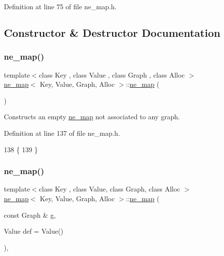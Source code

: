Definition at line 75 of file ne\+\_\+map.\+h.



\subsection{Constructor \& Destructor Documentation}
\mbox{\label{classne__map_acbe94c2209408e8af27fb9580251f360}} 
\subsubsection{\texorpdfstring{ne\+\_\+map()}{ne\_map()}\hspace{0.1cm}{\footnotesize\ttfamily [1/2]}}
{\footnotesize\ttfamily template$<$class Key , class Value , class Graph , class Alloc $>$ \\
\mbox{\hyperlink{classne__map}{ne\+\_\+map}}$<$ Key, Value, Graph, Alloc $>$\+::\mbox{\hyperlink{classne__map}{ne\+\_\+map}} (\begin{DoxyParamCaption}{ }\end{DoxyParamCaption})\hspace{0.3cm}{\ttfamily [protected]}}

Constructs an empty {\ttfamily \mbox{\hyperlink{classne__map}{ne\+\_\+map}}} not associated to any {\ttfamily graph}. 

Definition at line 137 of file ne\+\_\+map.\+h.


\begin{DoxyCode}
138 \{
139 \}
\end{DoxyCode}
\mbox{\label{classne__map_a769ee373d4cd8d3ef2c1577372da149c}} 
\subsubsection{\texorpdfstring{ne\+\_\+map()}{ne\_map()}\hspace{0.1cm}{\footnotesize\ttfamily [2/2]}}
{\footnotesize\ttfamily template$<$class Key , class Value, class Graph, class Alloc $>$ \\
\mbox{\hyperlink{classne__map}{ne\+\_\+map}}$<$ Key, Value, Graph, Alloc $>$\+::\mbox{\hyperlink{classne__map}{ne\+\_\+map}} (\begin{DoxyParamCaption}\item[{const Graph \&}]{g,  }\item[{Value}]{def = {\ttfamily Value()} }\end{DoxyParamCaption})\hspace{0.3cm}{\ttfamily [explicit]}, {\ttfamily [protected]}}

